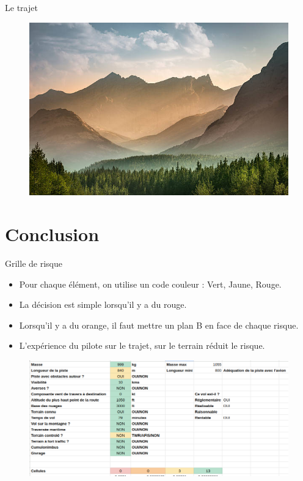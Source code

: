 \documentclass{beamer}
\begin{document}
\begin{frame}{Le trajet}
  \begin{figure}
    \centering
    \includegraphics[scale=0.3]{images/montagnes.jpg}
  \end{figure}
\end{frame}


\section{Conclusion}
\begin{frame}{Grille de risque}
  \begin{itemize}
    \item Pour chaque élément, on utilise un code couleur : Vert, Jaune, Rouge. \pause
    \item La décision est simple lorsqu'il y a du rouge. \pause
    \item Lorsqu'il y a du orange, il faut mettre un plan B en face de chaque risque. \pause
    \item L'expérience du pilote sur le trajet, sur le terrain réduit le risque.
  \end{itemize}
  \pause
  \begin{figure}
    \centering
    \includegraphics[scale=0.7]{images/tableau-risques.png}
  \end{figure}

\end{frame}
\end{document}
